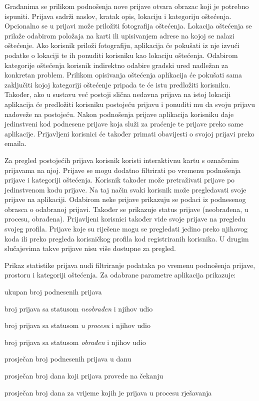 		Građanima se prilikom podnošenja nove prijave otvara obrazac koji je potrebno ispuniti. Prijava sadrži naslov, kratak opis, lokaciju i kategoriju oštećenja. Opcionalno se u prijavi može priložiti fotografija oštećenja. Lokacija oštećenja se prilaže odabirom položaja na karti ili upisivanjem adrese na kojoj se nalazi oštećenje. Ako korisnik priloži fotografiju, aplikacija će pokušati iz nje izvući podatke o lokaciji te ih ponuditi korisniku kao lokaciju oštećenja. Odabirom kategorije oštećenja korisnik indirektno odabire gradski ured nadležan za konkretan problem. Prilikom opisivanja oštećenja aplikacija će pokušati sama zaključiti kojoj kategoriji oštećenje pripada te će istu predložiti korisniku. Također, ako u sustavu već postoji slična nedavna prijava na istoj lokaciji aplikacija će predložiti korisniku postojeću prijavu i ponuditi mu da svoju prijavu nadoveže na postojeću. Nakon podnošenja prijave aplikacija korisniku daje jedinstveni kod podnesene prijave koja služi za praćenje te prijave preko same aplikacije. Prijavljeni korisnici će također primati obavijesti o svojoj prijavi preko emaila.
		
		Za pregled postojećih prijava korisnik koristi interaktivnu kartu s označenim prijavama na njoj. Prijave se mogu dodatno filtrirati po vremenu podnošenja prijave i kategoriji oštećenja. Korisnik također može pretraživati prijave po jedinstvenom kodu prijave. Na taj način svaki korisnik može pregledavati svoje prijave na aplikaciji. Odabirom neke prijave prikazuju se podaci iz podnesenog obrasca o odabranoj prijavi. Također se prikazuje status prijave (neobrađena, u procesu, obrađena). Prijavljeni korisnici također vide svoje prijave na pregledu svojeg profila. Prijave koje su riješene mogu se pregledati jedino preko njihovog koda ili preko pregleda korisničkog profila kod registriranih korisnika. U drugim slučajevima takve prijave nisu više dostupne za pregled.
		
		Prikaz statistike prijava nudi filtriranje podataka po vremenu podnošenja prijave, prostoru i kategoriji oštećenja. Za odabrane parametre aplikacija prikazuje:
		\begin{packed_item} 
			\item ukupan broj podnesenih prijava
			\item broj prijava sa statusom \textit{neobrađen} i njihov udio
			\item broj prijava sa statusom \textit{u procesu} i njihov udio
			\item broj prijava sa statusom \textit{obrađen} i njihov udio
			\item prosječan broj podnesenih prijava u danu
			\item prosječan broj dana koji prijava provede na čekanju
			\item prosječan broj dana za vrijeme kojih je prijava u procesu rješavanja
		\end{packed_item}
		
